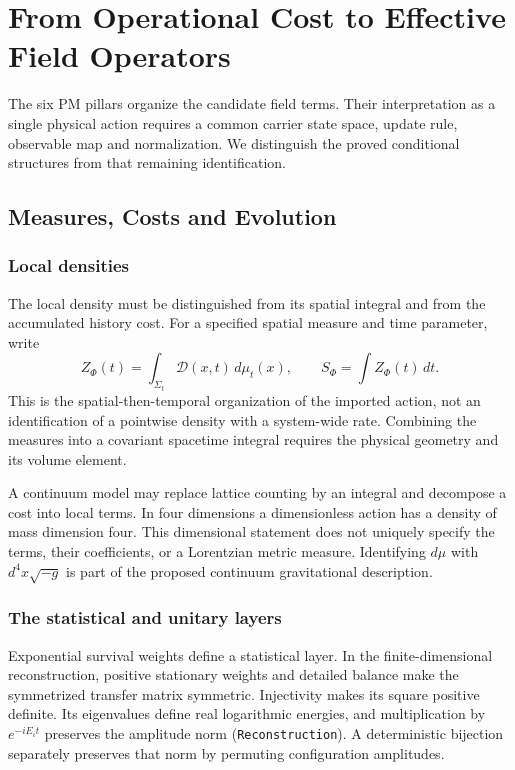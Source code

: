\section{From Operational Cost to Effective Field Operators}
\label{sec:entropic_lagrangian}

The six PM pillars organize the candidate field terms. Their interpretation as a single physical action requires a common carrier state space, update rule, observable map and normalization. We distinguish the proved conditional structures from that remaining identification.

\subsection{Measures, Costs and Evolution}
\label{sec:physics_translation}
\subsubsection{Local densities}
\label{sec:entropic_lagrangian_density}
The local density must be distinguished from its spatial integral and from the accumulated history cost. For a specified spatial measure and time parameter, write
\begin{equation}
 Z_\Phi(t)=\int_{\Sigma_t}\mathcal D(x,t)\,d\mu_t(x),\qquad
 S_\Phi=\int Z_\Phi(t)\,dt.
\end{equation}
This is the spatial-then-temporal organization of the imported action, not an identification of a pointwise density with a system-wide rate. Combining the measures into a covariant spacetime integral requires the physical geometry and its volume element.

A continuum model may replace lattice counting by an integral and decompose a cost into local terms. In four dimensions a dimensionless action has a density of mass dimension four. This dimensional statement does not uniquely specify the terms, their coefficients, or a Lorentzian metric measure. Identifying $d\mu$ with $d^4x\sqrt{-g}$ is part of the proposed continuum gravitational description.

\subsubsection{The statistical and unitary layers}
\label{subsec:observational_filter}
Exponential survival weights define a statistical layer. In the finite-dimensional reconstruction, positive stationary weights and detailed balance make the symmetrized transfer matrix symmetric. Injectivity makes its square positive definite. Its eigenvalues define real logarithmic energies, and multiplication by $e^{-iE_it}$ preserves the amplitude norm (\nolinkurl{Reconstruction}). A deterministic bijection separately preserves that norm by permuting configuration amplitudes.

